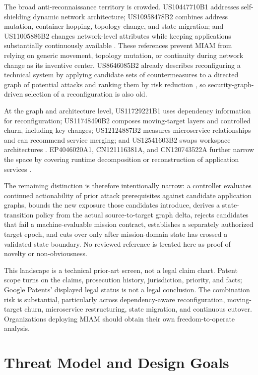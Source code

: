 \documentclass[11pt,letterpaper]{article}
\begin{document}
The broad anti-reconnaissance territory is crowded. US10447710B1 addresses self-shielding dynamic network architecture; US10958478B2 combines address mutation, container hopping, topology change, and state migration; and US11005886B2 changes network-level attributes while keeping applications substantially continuously available \cite{us10447710,us10958478,us11005886}. These references prevent MIAM from relying on generic movement, topology mutation, or continuity during network change as its inventive center. US8646085B2 already describes reconfiguring a technical system by applying candidate sets of countermeasures to a directed graph of potential attacks and ranking them by risk reduction \cite{us8646085}, so security-graph-driven selection of a reconfiguration is also old.

At the graph and architecture level, US11729221B1 uses dependency information for reconfiguration; US11748490B2 composes moving-target layers and controlled churn, including key changes; US12124887B2 measures microservice relationships and can recommend service merging; and US12541603B2 swaps workspace architectures \cite{us11729221,us11748490,us12124887,us12541603}. EP4046020A1, CN121116381A, and CN120743522A further narrow the space by covering runtime decomposition or reconstruction of application services \cite{ep4046020,cn121116381,cn120743522}.

The remaining distinction is therefore intentionally narrow: a controller evaluates continued actionability of prior attack prerequisites against candidate application graphs, bounds the new exposure those candidates introduce, derives a state-transition policy from the actual source-to-target graph delta, rejects candidates that fail a machine-evaluable mission contract, establishes a separately authorized target epoch, and cuts over only after mission-domain state has crossed a validated state boundary. No reviewed reference is treated here as proof of novelty or non-obviousness.

This landscape is a technical prior-art screen, not a legal claim chart. Patent scope turns on the claims, prosecution history, jurisdiction, priority, and facts; Google Patents' displayed legal status is not a legal conclusion. The combination risk is substantial, particularly across dependency-aware reconfiguration, moving-target churn, microservice restructuring, state migration, and continuous cutover. Organizations deploying MIAM should obtain their own freedom-to-operate analysis.

\section{Threat Model and Design Goals}\label{sec:threat}
\end{document}
